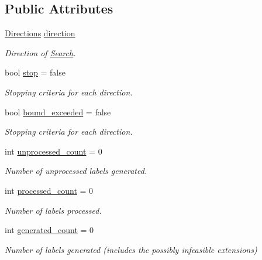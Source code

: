 \subsection*{Public Attributes}
\begin{DoxyCompactItemize}
\item 
\hyperlink{namespacebidirectional_a4cbe6f0bfbd3629c2cd44c98014aed70}{Directions} \hyperlink{classbidirectional_1_1Search_ad5a262892bdeae2978453c9967ab7372}{direction}
\begin{DoxyCompactList}\small\item\em Direction of \hyperlink{classbidirectional_1_1Search}{Search}. \end{DoxyCompactList}\item 
bool \hyperlink{classbidirectional_1_1Search_a0d03b4c804f947b14f7ec603d7005055}{stop} = false
\begin{DoxyCompactList}\small\item\em Stopping criteria for each direction. \end{DoxyCompactList}\item 
bool \hyperlink{classbidirectional_1_1Search_a51f9dea11b07ce6e196df86ce0912d7d}{bound\+\_\+exceeded} = false
\begin{DoxyCompactList}\small\item\em Stopping criteria for each direction. \end{DoxyCompactList}\item 
int \hyperlink{classbidirectional_1_1Search_a5143275aff96ad18651c6050832a854a}{unprocessed\+\_\+count} = 0
\begin{DoxyCompactList}\small\item\em Number of unprocessed labels generated. \end{DoxyCompactList}\item 
int \hyperlink{classbidirectional_1_1Search_a951da4144a4cf70e3288d0c5898769b9}{processed\+\_\+count} = 0
\begin{DoxyCompactList}\small\item\em Number of labels processed. \end{DoxyCompactList}\item 
int \hyperlink{classbidirectional_1_1Search_a3a9007631e48d796e85ae2cfc3a247ab}{generated\+\_\+count} = 0
\begin{DoxyCompactList}\small\item\em Number of labels generated (includes the possibly infeasible extensions) \end{DoxyCompactList}\item 

\end{DoxyCompactItemize}
